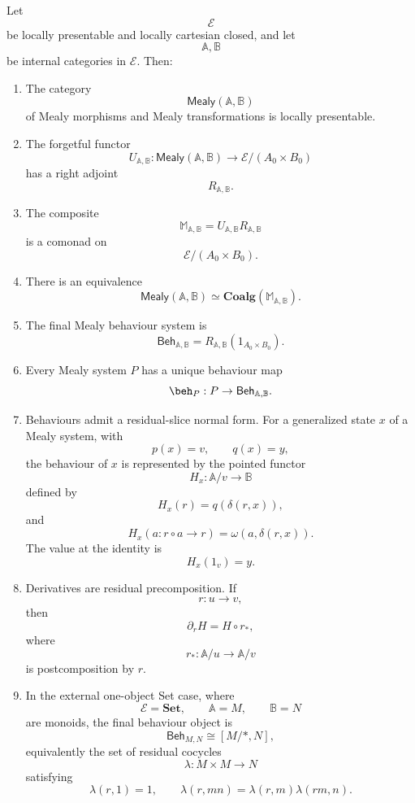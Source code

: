 \begin{theorem}
\label{thm:mealy-comonad-main-consolidation}
Let
\[
\mathcal E
\]
be locally presentable and locally cartesian closed, and let
\[
\mathbb A,\mathbb B
\]
be internal categories in \(\mathcal E\). Then:

\begin{enumerate}
\item The category
\[
\mathsf{Mealy}(\mathbb A,\mathbb B)
\]
of Mealy morphisms and Mealy transformations is locally presentable.

\item The forgetful functor
\[
U_{\mathbb A,\mathbb B}:
\mathsf{Mealy}(\mathbb A,\mathbb B)
\to
\mathcal E/(A_0\times B_0)
\]
has a right adjoint
\[
R_{\mathbb A,\mathbb B}.
\]

\item The composite
\[
\mathbb M_{\mathbb A,\mathbb B}
=
U_{\mathbb A,\mathbb B}R_{\mathbb A,\mathbb B}
\]
is a comonad on
\[
\mathcal E/(A_0\times B_0).
\]

\item There is an equivalence
\[
\mathsf{Mealy}(\mathbb A,\mathbb B)
\simeq
\mathbf{Coalg}(\mathbb M_{\mathbb A,\mathbb B}).
\]

\item The final Mealy behaviour system is
\[
\mathsf{Beh}_{\mathbb A,\mathbb B}
=
R_{\mathbb A,\mathbb B}(1_{A_0\times B_0}).
\]

\item Every Mealy system \(P\) has a unique behaviour map
\[
\beh_P:P\to\mathsf{Beh}_{\mathbb A,\mathbb B}.
\]

\item Behaviours admit a residual-slice normal form. For a generalized state
\(x\) of a Mealy system, with
\[
p(x)=v,
\qquad
q(x)=y,
\]
the behaviour of \(x\) is represented by the pointed functor
\[
H_x:\mathbb A/v\to\mathbb B
\]
defined by
\[
H_x(r)=q(\delta(r,x)),
\]
and
\[
H_x(a:r\circ a\to r)=\omega(a,\delta(r,x)).
\]
The value at the identity is
\[
H_x(1_v)=y.
\]

\item Derivatives are residual precomposition. If
\[
r:u\to v,
\]
then
\[
\partial_rH=H\circ r_\ast,
\]
where
\[
r_\ast:\mathbb A/u\to\mathbb A/v
\]
is postcomposition by \(r\).

\item In the external one-object Set case, where
\[
\mathcal E=\mathbf{Set},
\qquad
\mathbb A=M,
\qquad
\mathbb B=N
\]
are monoids, the final behaviour object is
\[
\mathsf{Beh}_{M,N}
\cong
[M/\ast,N],
\]
equivalently the set of residual cocycles
\[
\lambda:M\times M\to N
\]
satisfying
\[
\lambda(r,1)=1,
\qquad
\lambda(r,mn)=\lambda(r,m)\lambda(rm,n).
\]


\end{enumerate}
\end{theorem}
